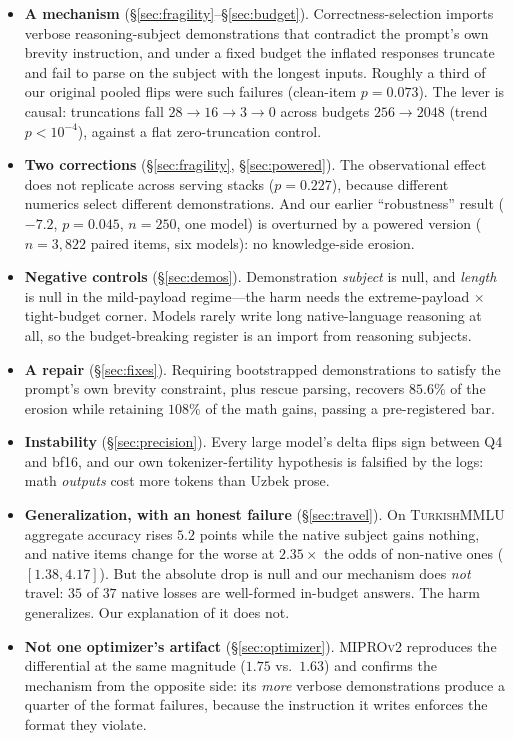 \documentclass[11pt]{article}
\begin{document}
\begin{itemize}\itemsep1pt
\item \textbf{A mechanism} (\S\ref{sec:fragility}--\S\ref{sec:budget}).
Correctness-selection imports verbose reasoning-subject demonstrations that contradict
the prompt's own brevity instruction, and under a fixed budget the inflated responses
truncate and fail to parse on the subject with the longest inputs. Roughly a third of
our original pooled flips were such failures (clean-item $p{=}0.073$). The lever is
causal: truncations fall $28{\to}16{\to}3{\to}0$ across budgets $256{\to}2048$ (trend
$p{<}10^{-4}$), against a flat zero-truncation control.
\item \textbf{Two corrections} (\S\ref{sec:fragility}, \S\ref{sec:powered}). The
observational effect does not replicate across serving stacks ($p{=}0.227$), because
different numerics select different demonstrations. And our earlier ``robustness''
result ($-7.2$, $p{=}0.045$, $n{=}250$, one model) is overturned by a powered version
($n{=}3{,}822$ paired items, six models): no knowledge-side erosion.
\item \textbf{Negative controls} (\S\ref{sec:demos}). Demonstration \emph{subject} is
null, and \emph{length} is null in the mild-payload regime---the harm needs the
extreme-payload $\times$ tight-budget corner. Models rarely write long native-language
reasoning at all, so the budget-breaking register is an import from reasoning subjects.
\item \textbf{A repair} (\S\ref{sec:fixes}). Requiring bootstrapped demonstrations to
satisfy the prompt's own brevity constraint, plus rescue parsing, recovers $85.6\%$ of
the erosion while retaining $108\%$ of the math gains, passing a pre-registered bar.
\item \textbf{Instability} (\S\ref{sec:precision}). Every large model's delta flips sign
between Q4 and bf16, and our own tokenizer-fertility hypothesis is falsified by the
logs: math \emph{outputs} cost more tokens than Uzbek prose.
\item \textbf{Generalization, with an honest failure} (\S\ref{sec:travel}). On
\textsc{TurkishMMLU} aggregate accuracy rises $5.2$ points while the native subject
gains nothing, and native items change for the worse at $2.35\times$ the odds of
non-native ones ($[1.38, 4.17]$). But the absolute drop is null and our mechanism does
\emph{not} travel: $35$ of $37$ native losses are well-formed in-budget answers. The
harm generalizes. Our explanation of it does not.
\item \textbf{Not one optimizer's artifact} (\S\ref{sec:optimizer}). \textsc{MIPROv2}
reproduces the differential at the same magnitude ($1.75$ vs.\ $1.63$) and confirms the
mechanism from the opposite side: its \emph{more} verbose demonstrations produce a
quarter of the format failures, because the instruction it writes enforces the format
they violate.
\end{itemize}
\end{document}

